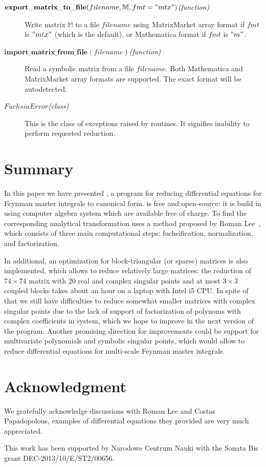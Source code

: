 \documentclass[12pt,a4paper]{article}
\def\F#1{\mathbf{#1}} %
\def\M#1{\mathbb{#1}} %
\def\functionitem#1#2{\item[$\F{#1}(#2)$\hfill\textit{(function)}]}
\def\classitem#1{\item[$#1$\hfill\textit{(class)}]}
\begin{document}
\begin{description}
\functionitem{export\_matrix\_to\_file}{filename, \M M, fmt="mtx"}
Write matrix $\M M$ to a file $filename$ using MatrixMarket array format if $fmt$ is $"mtx"$ (which is the default), or Mathematica format if $fmt$ is $"m"$.

\functionitem{import\_matrix\_from\_file}{filename}
Read a symbolic matrix from a file $filename$.
Both Mathematica and MatrixMarket array formats are supported.
The exact format will be autodetected.

\classitem{FuchsiaError}
This is the class of exceptions raised by \fuchsia routines.
It signifies inability to perform requested reduction. 

\end{description}


\section{Summary}
\label{sec:4}

In this paper we have presented \fuchsia, a program for reducing differential equations for Feynman master integrals to canonical form.
\fuchsia is free and open-source: it is build in \python using \maximasage computer algebra system which are available free of charge.
To find the corresponding analytical transformation \fuchsia uses a method proposed by Roman Lee~\cite{Lee15}, which consists of three main computational steps: fuchsification, normalization, and factorization.

In additional, an optimization for block-triangular (or sparse) matrices is also implemented, which allows to reduce relatively large matrices: the reduction of ${74\times74}$ matrix with 20 real and complex singular points and at most $3\times3$ coupled blocks takes about an hour on a laptop with Intel i5 CPU.
In spite of that we still have difficulties to reduce somewhat smaller matrices with complex singular points due to the lack of support of factorization of polynoms with complex coefficients in \maximasage system, which we hope to improve in the next version of the program.
Another promising direction for improvements could be support for multivariate polynomials and symbolic singular points, which would allow to reduce differential equations for multi-scale Feynman master integrals.

\section*{Acknowledgment}

We gratefully acknowledge discussions with Roman Lee and Costas Papadopolous, examples of differential equations they provided are very much appreciated.

This work has been supported by Narodowe Centrum Nauki with the Sonata Bis grant DEC-2013/10/E/ST2/00656.


\end{document}
